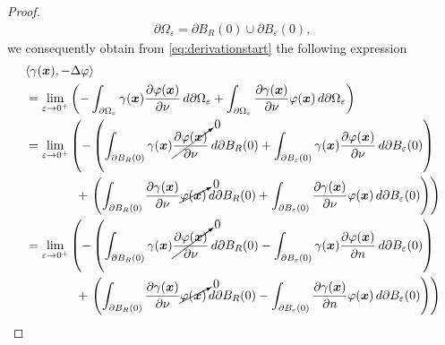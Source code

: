 \documentclass[12pt]{article}
\begin{document}
\begin{proof}
\begin{align}
		\partial \Omega_{\varepsilon} = \partial B_{R}(0) \cup \partial B_{\varepsilon}(0),
	\end{align}
	we consequently obtain from \eqref{eq:derivationstart}
	the following expression
	\begin{align}
		\label{eq:bigderivation}
		 & \langle \gamma(\Bx),-\Delta \varphi \rangle                                       \notag \\
		 & =
		\lim_{\varepsilon\to 0^+}
		\left(
		- \int_{\partial \Omega_\varepsilon} \gamma(\Bx)
		\frac{\partial\varphi(\Bx)}{\partial \nu} \, d\partial\Omega_{\varepsilon}
		+
		\int_{\partial\Omega_\varepsilon}
		\frac{\partial\gamma(\Bx)}{\partial\nu} \varphi(\Bx) \, d\partial\Omega_{\varepsilon}
		\right)                                                                              \notag \\
		 & =
		\lim_{\varepsilon\to 0^+}
		\left(
		- 
		\left(
		\int_{\partial B_{R}(0)} \gamma(\Bx)
		\cancelto{0}{\frac{\partial\varphi(\Bx)}{\partial \nu}} \, d\partial B_{R}(0)
		+ \int_{\partial B_{\varepsilon}(0)} \gamma(\Bx)
		\frac{\partial\varphi(\Bx)}{\partial \nu} \, d\partial B_{\varepsilon}(0)
		\right)
		\right.                                                                              \notag \\
		 & \quad\quad\quad\quad +
		\left.
		\left(
		\int_{\partial B_{R}(0)}
		\frac{\partial\gamma(\Bx)}{\partial\nu} \cancelto{0}{\varphi(\Bx)} \, d\partial B_{R}(0)
		+
		\int_{\partial B_{\varepsilon}(0)}
		\frac{\partial\gamma(\Bx)}{\partial \nu} \varphi(\Bx) \, d\partial B_{\varepsilon}(0)
		\right)
		\right)                                                                              \notag \\
		 & =
		\lim_{\varepsilon\to 0^+}
		\left(
		- 
		\left(
		\int_{\partial B_{R}(0)} \gamma(\Bx)
		\cancelto{0}{\frac{\partial\varphi(\Bx)}{\partial \nu}} \, d\partial B_{R}(0)
		- \int_{\partial B_{\varepsilon}(0)} \gamma(\Bx)
		\frac{\partial\varphi(\Bx)}{\partial n} \, d\partial B_{\varepsilon}(0)
		\right)
		\right.                                                                              \notag \\
		 & \quad\quad\quad\quad +
		\left.
		\left(
		\int_{\partial B_{R}(0)}
		\frac{\partial\gamma(\Bx)}{\partial\nu} \cancelto{0}{\varphi(\Bx)} \, d\partial B_{R}(0)
		-
		\int_{\partial B_{\varepsilon}(0)}
		\frac{\partial\gamma(\Bx)}{\partial n} \varphi(\Bx) \, d\partial B_{\varepsilon}(0)
		\right)
		\right)                                                                              \notag \\

\end{align}
\end{proof}
\end{document}
